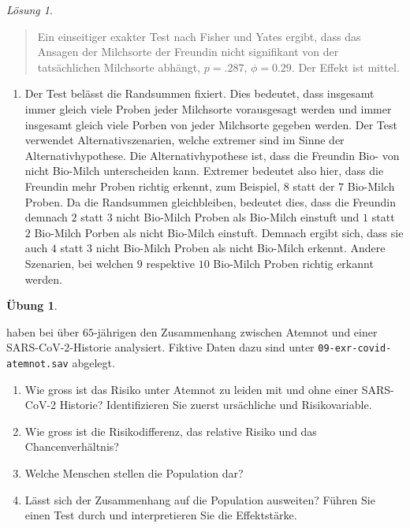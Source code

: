 \documentclass[
]{book}
\providecommand{\tightlist}{%
  \setlength{\itemsep}{0pt}\setlength{\parskip}{0pt}}
\theoremstyle{definition}
\theoremstyle{definition}
\theoremstyle{definition}
\newtheorem{exercise}{Übung}[chapter]
\theoremstyle{definition}
\theoremstyle{remark}
\newtheorem*{solution}{Lösung}
\begin{document}
\begin{solution}
\begin{quote}
Ein einseitiger exakter Test nach Fisher und Yates ergibt, dass das Ansagen der Milchsorte der Freundin nicht signifikant von der tatsächlichen Milchsorte abhängt, \(p = .287\), \(\phi = 0.29\). Der Effekt ist mittel.
\end{quote}

\begin{enumerate}
\def\labelenumi{\alph{enumi})}
\setcounter{enumi}{3}
\tightlist
\item
  Der Test belässt die Randsummen fixiert. Dies bedeutet, dass insgesamt immer gleich viele Proben jeder Milchsorte vorausgesagt werden und immer insgesamt gleich viele Porben von jeder Milchsorte gegeben werden. Der Test verwendet Alternativszenarien, welche extremer sind im Sinne der Alternativhypothese. Die Alternativhypothese ist, dass die Freundin Bio- von nicht Bio-Milch unterscheiden kann. Extremer bedeutet also hier, dass die Freundin mehr Proben richtig erkennt, zum Beispiel, \(8\) statt der \(7\) Bio-Milch Proben. Da die Randsummen gleichbleiben, bedeutet dies, dass die Freundin demnach \(2\) statt \(3\) nicht Bio-Milch Proben als Bio-Milch einstuft und \(1\) statt \(2\) Bio-Milch Porben als nicht Bio-Milch einstuft. Demnach ergibt sich, dass sie auch \(4\) statt \(3\) nicht Bio-Milch Proben als nicht Bio-Milch erkennt. Andere Szenarien, bei welchen \(9\) respektive \(10\) Bio-Milch Proben richtig erkannt werden.
\end{enumerate}

\end{solution}

\begin{exercise}
\protect\hypertarget{exr:covid-sterblichkeit}{}\label{exr:covid-sterblichkeit}\leavevmode

\citet{cohen2022} haben bei über \(65\)-jährigen den Zusammenhang zwischen Atemnot und einer SARS-CoV-2-Historie analysiert. Fiktive Daten dazu sind unter
\texttt{09-exr-covid-atemnot.sav} abgelegt.

\begin{enumerate}
\def\labelenumi{\alph{enumi})}
\tightlist
\item
  Wie gross ist das Risiko unter Atemnot zu leiden mit und ohne einer SARS-CoV-2 Historie? Identifizieren Sie zuerst ursächliche und Risikovariable.
\item
  Wie gross ist die Risikodifferenz, das relative Risiko und das Chancenverhältnis?
\item
  Welche Menschen stellen die Population dar?
\item
  Lässt sich der Zusammenhang auf die Population ausweiten? Führen Sie einen Test durch und interpretieren Sie die Effektstärke.
\end{enumerate}

\end{exercise}
\end{document}
